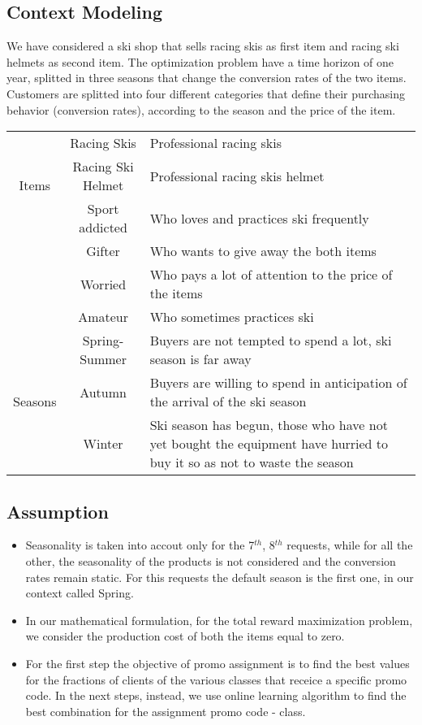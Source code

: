\subsection*{Context Modeling}
We have considered a ski shop that sells racing skis as first item and racing ski helmets as second item. The optimization problem have a time horizon of one year, splitted in three seasons that change the conversion rates of the two items. Customers are splitted into four different categories that define their purchasing behavior (conversion rates), according to the season and the price of the item.

\begin{center}
	\begin{tabular}{ |c|c|p{9cm}| } 
	\hline
	\multirow{3}{4em}{Items} & Racing Skis & Professional racing skis \\ 
	& Racing Ski Helmet &  Professional racing skis helmet\\ 
	\hline
	\multirow{3}{4em}{Customer categories} & Sport addicted & Who loves and practices ski frequently\\ 
	& Gifter &  Who wants to give away the both items\\
	& Worried &  Who pays a lot of attention to the price of the items\\ 
	& Amateur &  Who sometimes practices ski\\ 
	\hline
	\multirow{3}{4em}{Seasons} & Spring-Summer & Buyers are not tempted to spend a lot, ski season is far away\\ 
	& Autumn & Buyers are willing to spend in anticipation of the arrival of the ski season \\
	& Winter &  Ski season has begun, those who have not yet bought the equipment have hurried to buy it so as not to waste the season\\  
	\hline
	\end{tabular}
	\end{center}

\subsection*{Assumption}
\begin{itemize}
		\item Seasonality is taken into accout only for the 7$^{th}$, 8$^{th}$ requests, while for all the other, the seasonality of the products is not considered and the conversion rates remain static. For this requests the default season is the first one, in our context called Spring.  
		\item In our mathematical formulation, for the total reward maximization problem, we consider the production cost of both the items equal to zero.
		\item For the first step the objective of promo assignment is to find the best values for the fractions of clients of the various classes that receice a specific promo code. In the next steps, instead, we use online learning algorithm to find the best combination for the assignment promo code - class.
	\end{itemize}